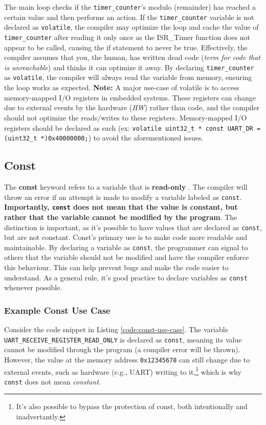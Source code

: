 \documentclass[main.tex]{subfiles}
\begin{document}
\noindent The main loop checks if the \texttt{timer\_counter}'s modulo (remainder) has reached a certain value and then performs an action. If the \texttt{timer\_counter} variable is not declared as \texttt{volatile}, the compiler may optimize the loop and cache the value of \texttt{timer\_counter} after reading it only once as the ISR\_Timer function does not appear to be called, causing the if statement to never be true. Effectively, the compiler assumes that you, the human, has written dead code (\textit{term for code that is unreachable}) and thinks it can optimize it away. By declaring \texttt{timer\_counter} as \texttt{volatile}, the compiler will always read the variable from memory, ensuring the loop works as expected.
\newline
\newline
\textbf{Note:} A major use-case of volatile is to access memory-mapped I/O registers in embedded systems. These registers can change due to external events by the hardware (\textit{HW}) rather than code, and the compiler should not optimize the reads/writes to these registers. Memory-mapped I/O registers should be declared as such (ex: \texttt{volatile uint32\_t * const UART\_DR = (uint32\_t *)0x40000000;}) to avoid the aforementioned issues.

\subsection{Const}
The \textbf{const} keyword refers to a variable that is \textbf{read-only} \cite{beningoConst}. The compiler will throw an error if an attempt is made to modify a variable labeled as \texttt{const}. \textbf{Importantly, \texttt{const} does not mean that the value is constant, but rather that the variable cannot be modified by the program}. The distinction is important, as it's possible to have values that are declared as \texttt{const}, but are not constant. 
\newline
\newline
\noindent Const's primary use is to make code more readable and maintainable. By declaring a variable as \texttt{const}, the programmer can signal to others that the variable should not be modified and have the compiler enforce this behaviour. This can help prevent bugs and make the code easier to understand. As a general rule, it's good practice to declare variables as \texttt{const} whenever possible.

\subsubsection{Example Const Use Case}
Consider the code snippet in Listing \ref{code:const-use-case}. The variable \texttt{UART\_RECEIVE\_REGISTER\_READ\_ONLY} is declared as \texttt{const}, meaning its value cannot be modified through the program (a compiler error will be thrown). However, the value at the memory address \texttt{0x12345678} can still change due to external events, such as hardware (e.g., UART) writing to it,\footnote{It's also possible to bypass the protection of const, both intentionally and inadvertantly.} which is why \texttt{const} does not mean \textit{constant}.
\end{document}
